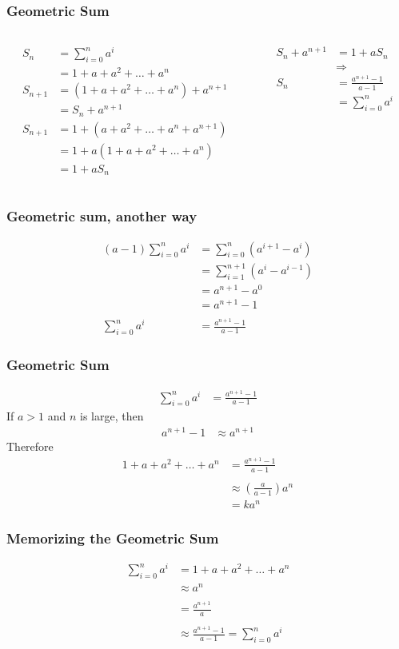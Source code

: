 \documentclass{beamer}
\newcommand{\bfr}[1]{\begin{frame}[fragile]\frametitle{{ #1 }}}
\newcommand{\cola}{\begin{columns}\begin{column}{0.5\textwidth}}
\newcommand{\colb}{\end{column}\begin{column}{0.5\textwidth}}
\newcommand{\colc}{\end{column}\end{columns}}
\begin{document}
\bfr{Geometric Sum}
\cola
\begin{align*}
  S_n &= 
   \sum_{i=0}^n a^i\\
  &= 1 + a + a^2 + \ldots + a^n
  \\
  S_{n+1} &= (1 + a + a^2 + \ldots + a^n) + a^{n+1}
  \\
  &= S_{n} + a^{n+1}
  \\
  S_{n+1} &= 1 + (a + a^2 + \ldots + a^n + a^{n+1})
  \\
  &= 1 + a(1 + a + a^2  +  \ldots + a^n)
  \\
  &= 1 + aS_n
\end{align*}
\colb
\begin{align*}
  S_n + a^{n+1} &= 1 + aS_n
  \\
  &\Rightarrow\\
 S_n
  &= \frac{a^{n+1} - 1}{a-1}\\
  &=   \sum_{i=0}^n a^i 
\end{align*}
\colc
\end{frame}

\bfr{Geometric sum, another way}
\begin{align*}
(a-1)\sum_{i=0}^n a^i &= \sum_{i=0}^n \left(a^{i+1} -a^i\right)\\
  &= \sum_{i=1}^{n+1} \left(a^{i} - a^{i-1}\right)\\
  &= a^{n+1} - a^0\\
  &= a^{n+1} - 1\\\\
  \sum_{i=0}^n a^i &= \frac{a^{n+1} - 1}{a-1}
\end{align*}
\end{frame}

\bfr{Geometric Sum}
\begin{align*}
\sum_{i=0}^n a^i &= \frac{a^{n+1} - 1}{a-1}
\end{align*}
If $a>1$ and $n$ is large, then
\begin{align*}
a^{n+1}-1 &\approx a^{n+1}
\end{align*}
Therefore
\begin{align*}
1+a+a^2+\ldots+a^n &= \frac{a^{n+1}-1}{a-1}\\\\
  &\approx \left(\frac{a}{a-1}\right) a^n\\
  &= ka^n
\end{align*}
  

\end{frame}

\bfr{Memorizing the Geometric Sum}
\begin{align*}
\sum_{i=0}^n a^i &=
1 + a + a^2 + \ldots + a^n\\
 &\approx a^n\\\\
 &= \frac{a^{n+1}}{a} \\\\
 &\approx \frac{a^{n+1} -1}{a-1}
 = 
\sum_{i=0}^n a^i
\end{align*}
\end{frame}
\end{document}
